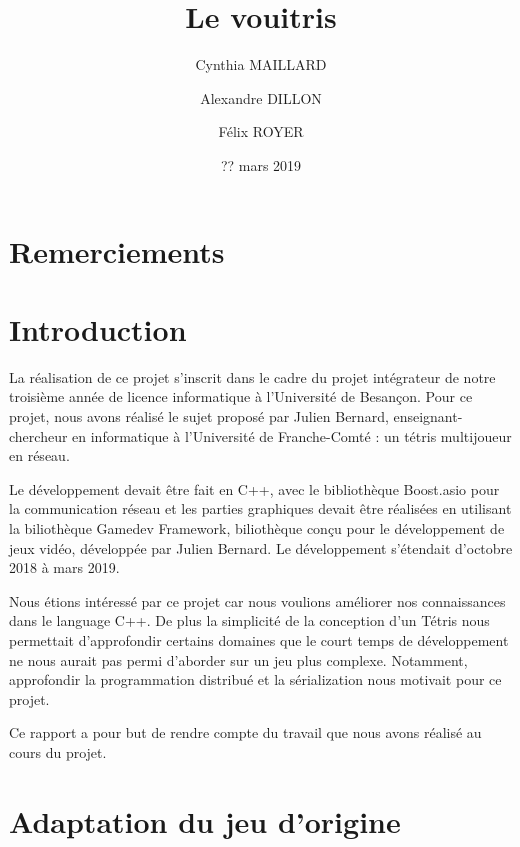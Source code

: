 \documentclass[a4paper, 12pt]{article}
\title{Le vouitris}
\date{?? mars 2019}
\author{Cynthia MAILLARD \and Alexandre DILLON \and Félix ROYER}
\begin{document}
\maketitle

\newpage

\tableofcontents

\newpage

\section*{Remerciements}
	
\section*{Introduction}
	La réalisation de ce projet s'inscrit dans le cadre du projet intégrateur de notre troisième année de licence informatique à l'Université de Besançon. Pour ce projet, nous avons réalisé le sujet proposé par Julien Bernard, enseignant-chercheur en informatique à l'Université de Franche-Comté : un tétris multijoueur en réseau. 

	\bigskip

	Le développement devait être fait en C++, avec le bibliothèque Boost.asio pour la communication réseau et les parties graphiques devait être réalisées en utilisant la biliothèque Gamedev Framework, biliothèque conçu pour le développement de jeux vidéo, développée par Julien Bernard.
	Le développement s'étendait d'octobre 2018 à mars 2019.

	\bigskip
	Nous étions intéressé par ce projet car nous voulions améliorer nos connaissances dans le language C++. De plus la simplicité de la conception d'un Tétris nous permettait d'approfondir certains domaines que le court temps de développement ne nous aurait pas permi d'aborder sur un jeu plus complexe. Notamment, approfondir la programmation distribué et la sérialization nous motivait pour ce projet.

	\bigskip
	Ce rapport a pour but de rendre compte du travail que nous avons réalisé au cours du projet.

	\newpage

\section{Adaptation du jeu d'origine}
\end{document}
